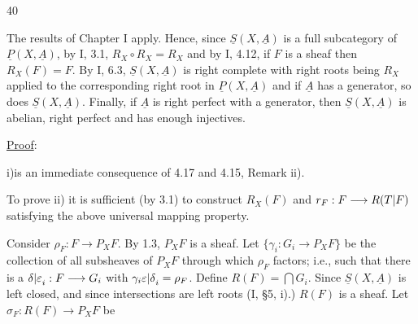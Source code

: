 \hfill 40

The results of Chapter I apply. Hence, since $\underline S(X,\underline A)$ is
a full subcategory of $\underline P(X,\underline A)$, by I, 3.1,
$R_X\circ R_X=R_X$ and by I, 4.12, if $F$ is a sheaf then $R_X(F)=F$.
By I, 6.3, $\underline S(X,\underline A)$ is right complete with right roots
being $R_X$ applied to the corresponding right root in
$\underline P(X,\underline A)$ and if $\underline A$ has a generator,
so does $\underline S(X,\underline A)$. Finally, if $\underline A$ is
right perfect with a generator, then $\underline S(X,\underline A)$ is
abelian, right perfect and has enough injectives.

\uline{Proof}:

i)\quad is an immediate consequence of 4.17 and 4.15, Remark ii).

To prove ii) it is sufficient (by 3.1) to construct $R_X(F)$ and
$r_F:F\longrightarrow R({T|F})$ satisfying the above universal mapping property.

Consider $\rho_F:F\longrightarrow P_XF$. By 1.3, $P_XF$ is a sheaf.
Let $\{\gamma_i:G_i\longrightarrow P_XF\}$ be the collection of all subsheaves
of $P_XF$ through which $\rho_F$ factors; i.e., such that there is a
${\delta|\varepsilon}_i:F\longrightarrow G_i$ with
$\gamma_i{\varepsilon|\delta}_i=\rho_F$.
Define $R(F)=\bigcap G_i$.
Since $\underline S(X,\underline A)$ is left closed, and since intersections
are left roots (I, \S 5, i).) $R(F)$ is a sheaf.
Let $\sigma_F:R(F)\longrightarrow P_XF$ be
